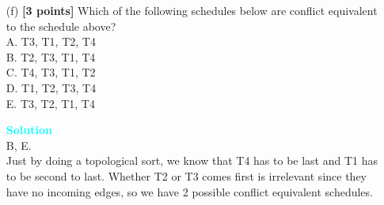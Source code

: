 \documentclass[10pt]{article}
\newenvironment{solution}
    { \begin{mdframed}[backgroundcolor=gray!10] \textcolor{cyan}{\textbf{Solution}} \\}
    {  \end{mdframed}}
\begin{document}
\begin{itemize}
	\item[(f)] \textbf{[3 points]} Which of the following schedules below are conflict equivalent to the schedule above?\\
	      A. T3, T1, T2, T4\\
	      B. T2, T3, T1, T4\\
	      C. T4, T3, T1, T2\\
	      D. T1, T2, T3, T4\\
	      E. T3, T2, T1, T4
	      \begin{solution}
		      B, E.\\
		      Just by doing a topological sort, we know that T4 has to be last and T1 has to be
		      second to last. Whether T2 or T3 comes first is irrelevant since they have no incoming edges,
		      so we have 2 possible conflict equivalent schedules.
	      \end{solution}

\end{itemize}


\newpage
\end{document}
